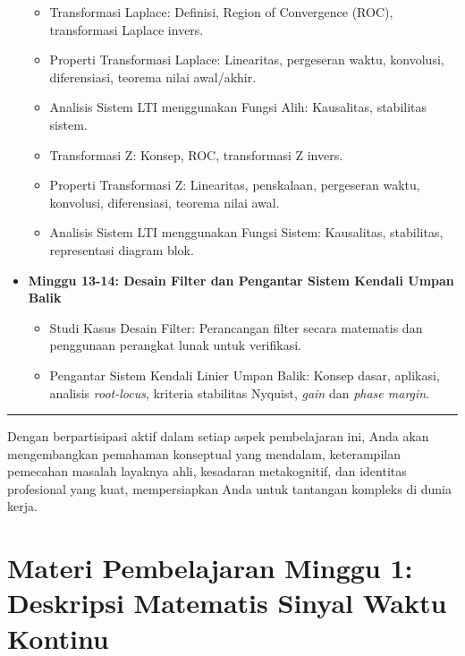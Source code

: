 \documentclass[
  letterpaper,
  DIV=11,
  numbers=noendperiod]{scrreprt}
\providecommand{\tightlist}{%
  \setlength{\itemsep}{0pt}\setlength{\parskip}{0pt}}
\begin{document}
\begin{itemize}
  \begin{itemize}
  \tightlist
  \item
    Transformasi Laplace: Definisi, Region of Convergence (ROC),
    transformasi Laplace invers.
  \item
    Properti Transformasi Laplace: Linearitas, pergeseran waktu,
    konvolusi, diferensiasi, teorema nilai awal/akhir.
  \item
    Analisis Sistem LTI menggunakan Fungsi Alih: Kausalitas, stabilitas
    sistem.
  \item
    Transformasi Z: Konsep, ROC, transformasi Z invers.
  \item
    Properti Transformasi Z: Linearitas, penskalaan, pergeseran waktu,
    konvolusi, diferensiasi, teorema nilai awal.
  \item
    Analisis Sistem LTI menggunakan Fungsi Sistem: Kausalitas,
    stabilitas, representasi diagram blok.
  \end{itemize}
\item
  \textbf{Minggu 13-14: Desain Filter dan Pengantar Sistem Kendali Umpan
  Balik}

  \begin{itemize}
  \tightlist
  \item
    Studi Kasus Desain Filter: Perancangan filter secara matematis dan
    penggunaan perangkat lunak untuk verifikasi.
  \item
    Pengantar Sistem Kendali Linier Umpan Balik: Konsep dasar, aplikasi,
    analisis \emph{root-locus}, kriteria stabilitas Nyquist, \emph{gain}
    dan \emph{phase margin}.
  \end{itemize}
\end{itemize}

\begin{center}\rule{0.5\linewidth}{0.5pt}\end{center}

Dengan berpartisipasi aktif dalam setiap aspek pembelajaran ini, Anda
akan mengembangkan pemahaman konseptual yang mendalam, keterampilan
pemecahan masalah layaknya ahli, kesadaran metakognitif, dan identitas
profesional yang kuat, mempersiapkan Anda untuk tantangan kompleks di
dunia kerja.


\chapter{Materi Pembelajaran Minggu 1: Deskripsi Matematis Sinyal Waktu
Kontinu}\label{materi-pembelajaran-minggu-1-deskripsi-matematis-sinyal-waktu-kontinu}
\end{document}
